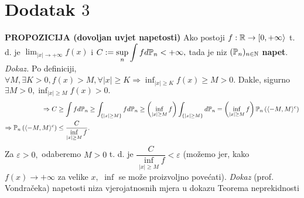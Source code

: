 \documentclass{article}
\begin{document}
\section{Dodatak \(3\)}
\textbf{PROPOZICIJA (dovoljan uvjet napetosti)}\newline
Ako postoji \(f:\Bbb R\to[0,+\infty\rangle\) t. d. je \(\displaystyle\lim_{|x|\to+\infty}f(x)\) i \(\displaystyle C:=\sup_n\int fd\Bbb P_n<+\infty,\) tada je niz \((\Bbb P_n)_{n\in\Bbb N}\) \textbf{napet}.\newline\newline
\textit{Dokaz.}\newline
Po definiciji, \(\displaystyle\forall M,\exists K>0, f(x)>M,\forall |x|\ge K\Rightarrow\inf_{|x|\ge K}f(x)\ge M>0.\) Dakle, sigurno \(\displaystyle\exists M>0,\inf_{|x|\ge M}f(x)>0.\) \[\begin{aligned}\Rightarrow C&\ge\int fd\Bbb P_n\ge\int_{\left\{|x|\ge M\right\}}fd\Bbb P_n\ge\left(\inf_{|x|\ge M}f\right)\int_{\left\{|x|\ge M\right\}}d\Bbb P_n=\left(\inf_{|x|\ge M}f\right)\Bbb P_n\left(\langle -M,M\rangle^c\right)\\\Rightarrow\Bbb P_n\left(\langle -M,M\rangle^c\right)&\le\frac{C}{\inf\limits_{|x|\ge M}f}.\end{aligned}\] Za \(\varepsilon>0,\) odaberemo \(M>0\) t. d. je \(\dfrac{C}{\inf\limits_{|x|\ge M}f}<\varepsilon\) (možemo jer, kako \(f(x)\to+\infty\) za velike \(x,\) \(\inf\) se može proizvoljno povećati).\newline\newline
\textit{Dokaz} (prof. Vondračeka) napetosti niza vjerojatnosnih mjera u dokazu Teorema neprekidnosti\newline\newline
\end{document}
